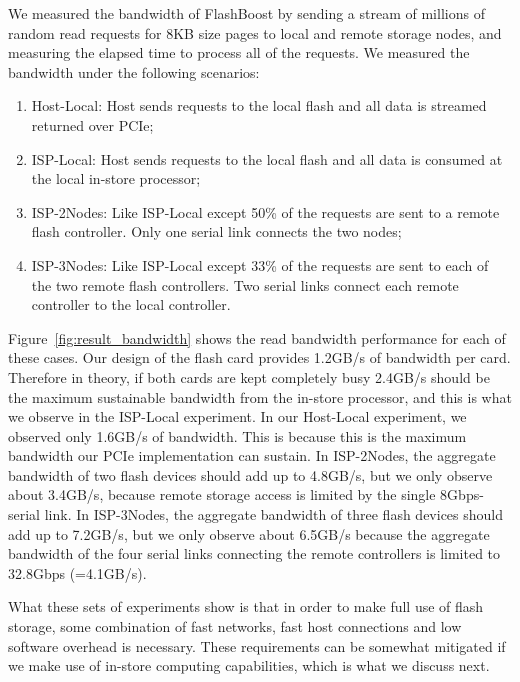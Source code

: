 We measured the bandwidth of FlashBoost by sending a stream of millions of random read requests for 8KB size pages to local and remote storage nodes, and measuring the elapsed time to process all of the requests.
We measured the bandwidth under the following scenarios:
\begin{enumerate}
\item Host-Local: Host sends requests to the local flash and all data is streamed returned over PCIe;
\item ISP-Local: Host sends requests to the local flash and all data is consumed at the local in-store processor;
\item ISP-2Nodes: Like ISP-Local except 50\% of the requests are sent to a remote flash controller. Only one serial link connects the two nodes;
\item ISP-3Nodes: Like ISP-Local except 33\% of the requests are sent to each of the two remote flash controllers. Two serial links connect each remote controller to the local controller.
\end{enumerate}

Figure~\ref{fig:result_bandwidth} shows the read bandwidth performance for each of these cases. Our design of the flash card provides 1.2GB/s of bandwidth per card. Therefore in theory, if both cards are kept completely busy 2.4GB/s should be the maximum sustainable bandwidth from the in-store processor, and this is what we observe in the ISP-Local experiment. In our Host-Local experiment, we observed only 1.6GB/s of bandwidth. This is because this is the maximum bandwidth our PCIe implementation can sustain. In ISP-2Nodes, the aggregate bandwidth of two flash devices should add up to 4.8GB/s, but we only observe about 3.4GB/s, because remote storage access is limited by the single 8Gbps-serial link. In ISP-3Nodes, the aggregate bandwidth of three flash devices should add up to 7.2GB/s, but we only observe about 6.5GB/s because the aggregate bandwidth of the four serial links connecting the remote controllers is limited to 32.8Gbps (=4.1GB/s).

What these sets of experiments show is that in order to make full use of flash storage, some combination of fast networks, fast host connections and low software overhead is necessary. These requirements can be somewhat mitigated if we make use of in-store computing capabilities, which is what we discuss next.



